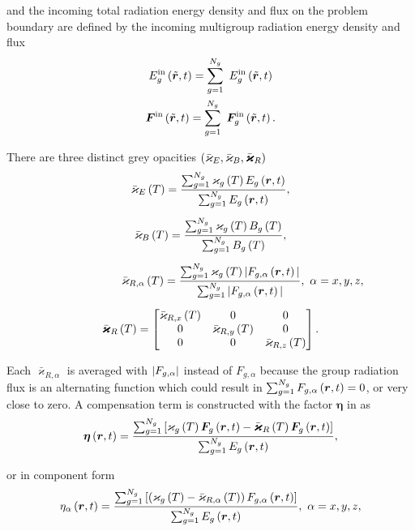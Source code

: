 	and the incoming total radiation energy density and flux on the problem boundary are defined by the incoming multigroup radiation energy density and flux
	\begin{subequations}
		\begin{gather}
			E_g^{\text{in}}\left(\tilde{\bm{r}},t\right) = \sum_{g=1}^{N_g} \ E_g^{\text{in}}\left(\tilde{\bm{r}},t\right) \\
			\bm{F}^{\text{in}}\left(\tilde{\bm{r}},t\right) = \sum_{g=1}^{N_g} \ \bm{F}_g^{\text{in}}\left(\tilde{\bm{r}},t\right).
		\end{gather}
	\end{subequations}
	
	There are three distinct grey opacities $\left(\bar{\varkappa}_{E},\bar{\varkappa}_{B},\bar{\bm{\varkappa}}_{R}\right)$
	\begin{subequations}
		\begin{gather}
			\bar{\varkappa}_{E}\left( T\right) = \frac{ \sum_{g=1}^{N_g}\varkappa_{g}\left( T\right)E_g\left(\bm{r},t\right) }{ \sum_{g=1}^{N_g}E_g\left(\bm{r},t\right) }, \\[5pt]
			\bar{\varkappa}_{B}\left( T\right) = \frac{ \sum_{g=1}^{N_g}\varkappa_{g}\left( T\right)B_{g}\left( T\right) }{ \sum_{g=1}^{N_g}B_{g}\left( T\right) }, \\[5pt]
			\hspace{2cm} \bar{\varkappa}_{R,\alpha}\left( T\right) = \frac{ \sum_{g=1}^{N_g}\varkappa_{g}\left( T\right)|F_{g,\alpha}\left(\bm{r},t\right)| }{ \sum_{g=1}^{N_g}|F_{g,\alpha}\left(\bm{r},t\right)| }, \ \alpha=x,y,z, \\[5pt]
			\bar{\bm{\varkappa}}_{R}\left( T\right) = \begin{bmatrix} \bar{\varkappa}_{R,x}\left( T\right) & 0 & 0 \\ 0 & \bar{\varkappa}_{R,y}\left( T\right) & 0 \\ 0 & 0 & \bar{\varkappa}_{R,z}\left( T\right) \end{bmatrix}.
		\end{gather}
		\label{grey_opacities}
	\end{subequations}
	
	Each $\bar{\varkappa}_{R,\alpha}$ is averaged with $|F_{g,\alpha}|$ instead of $F_{g,\alpha}$ because the group radiation flux is an alternating function which could result in $\sum_{g=1}^{N_g}F_{g,\alpha}\left(\bm{r},t\right) = 0$, or very close to zero. A compensation term is constructed with the factor $\bm{\eta}$ in  as
	\begin{equation}
		\bm{\eta}\left(\bm{r},t\right) = \frac{ \sum_{g=1}^{N_g}\left[\varkappa_{g}\left( T\right)\bm{F}_g\left(\bm{r},t\right) - \bar{\bm{\varkappa}}_{R}\left( T\right)\bm{F}_g\left(\bm{r},t\right)\right] }{ \sum_{g=1}^{N_g}E_g\left(\bm{r},t\right) }, \label{eta_comp}
	\end{equation}
	
	or in component form
	\begin{equation}
		\eta_{\alpha}\left(\bm{r},t\right) = \frac{ \sum_{g=1}^{N_g}\left[\left(\varkappa_{g}\left( T\right) - \bar{\varkappa}_{R,\alpha}\left( T\right)\right) F_{g,\alpha}\left(\bm{r},t\right)\right] }{ \sum_{g=1}^{N_g}E_g\left(\bm{r},t\right) }, \ \alpha=x,y,z, \label{eta_comp2}
	\end{equation}
	
